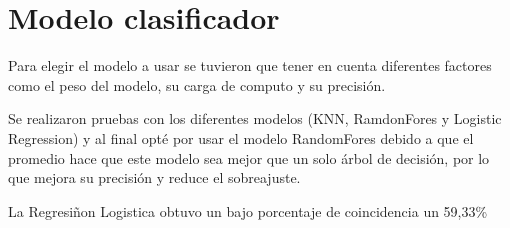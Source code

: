\section{Modelo clasificador}
Para elegir el modelo a usar se tuvieron que tener en cuenta diferentes factores como el peso del modelo, su carga de computo y su precisión.

Se realizaron pruebas con los diferentes modelos (KNN, RamdonFores y Logistic Regression) y al final opté por usar el modelo RandomFores debido a que el promedio hace que este modelo sea mejor que un solo árbol de decisión, por lo que mejora su precisión y reduce el sobreajuste.

La Regresiñon Logistica obtuvo un bajo porcentaje de coincidencia un 59,33\%



